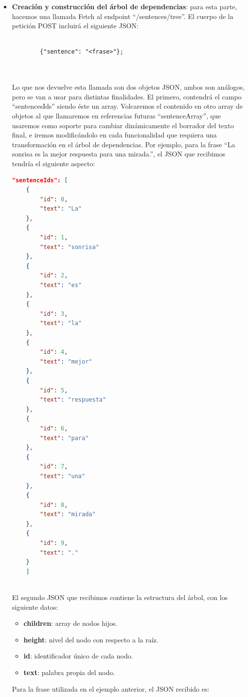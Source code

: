 \begin{itemize}
    Al igual que en el caso anterior, haremos un recorrido en cada frase del array para mostrarlas en la interfaz de frases seleccionables en modo lista.
 
	
	\item \textbf{Creación y construcción del árbol de dependencias}: para esta parte, hacemos una llamada Fetch al endpoint ``/sentences/tree''. El cuerpo de la petición POST incluirá el siguiente JSON:
	\begin{lstlisting}
		
		{"sentence": "<frase>"};
		
		
	\end{lstlisting}
	Lo que nos devuelve esta llamada son dos objetos JSON, ambos son análogos, pero se van a usar para distintas finalidades. El primero, contendrá el campo ``sentencesIds'' siendo éste un array. Volcaremos el contenido en otro array de objetos al que llamaremos en referencias futuras ``sentenceArray'', que usaremos como soporte para cambiar dinámicamente el borrador del texto final, e iremos modificándolo en cada funcionalidad que requiera una transformación en el árbol de dependencias. Por ejemplo, para la frase ``La sonrisa es la mejor respuesta para una mirada.'', el JSON que recibimos tendría el siguiente aspecto: 
		\begin{lstlisting}[language=json,firstnumber=1]
	 "sentenceIds": [
	{
		"id": 0,
		"text": "La"
	},
	{
		"id": 1,
		"text": "sonrisa"
	},
	{
		"id": 2,
		"text": "es"
	},
	{
		"id": 3,
		"text": "la"
	},
	{
		"id": 4,
		"text": "mejor"
	},
	{
		"id": 5,
		"text": "respuesta"
	},
	{
		"id": 6,
		"text": "para"
	},
	{
		"id": 7,
		"text": "una"
	},
	{
		"id": 8,
		"text": "mirada"
	},
	{
		"id": 9,
		"text": "."
	}
	]
		
	\end{lstlisting}
	
	
	El segundo JSON que recibimos contiene la estructura del árbol, con los siguiente datos:
		\begin{itemize}
		\item \textbf{children}: array de nodos hijos.
		\item \textbf{height}: nivel del nodo con respecto a la raíz.
		\item \textbf{id}: identificador único de cada nodo.
		\item \textbf{text}: palabra propia del nodo.
	\end{itemize}
	Para la frase utilizada en el ejemplo anterior, el JSON recibido es: 
	

\end{itemize}
